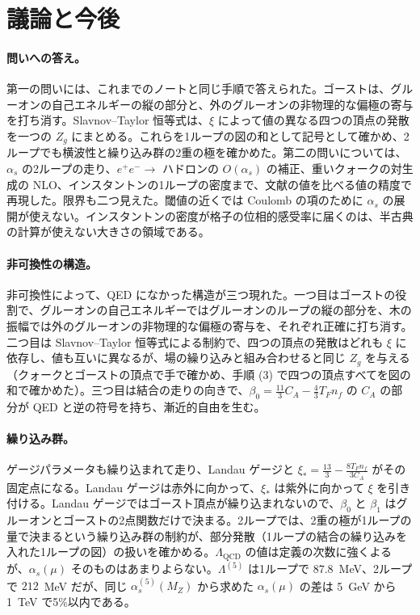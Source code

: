 \documentclass[a4paper,10pt]{ltjsarticle}
\begin{document}
\FloatBarrier
\section{議論と今後}\label{sec:discussion}

\paragraph{問いへの答え。}第一の問いには、これまでのノートと同じ手順で答えられた。ゴーストは、グルーオンの自己エネルギーの縦の部分と、外のグルーオンの非物理的な偏極の寄与を打ち消す。Slavnov--Taylor 恒等式は、$\xi$ によって値の異なる四つの頂点の発散を一つの $Z_g$ にまとめる。これらを1ループの図の和として記号として確かめ、2ループでも横波性と繰り込み群の2重の極を確かめた。第二の問いについては、$\alpha_s$ の2ループの走り、$e^+e^-\to$ ハドロンの $O(\alpha_s)$ の補正、重いクォークの対生成の NLO、インスタントンの1ループの密度まで、文献の値を比べる値の精度で再現した。限界も二つ見えた。閾値の近くでは Coulomb の項のために $\alpha_s$ の展開が使えない。インスタントンの密度が格子の位相的感受率に届くのは、半古典の計算が使えない大きさの領域である。

\paragraph{非可換性の構造。}非可換性によって、QED になかった構造が三つ現れた。一つ目はゴーストの役割で、グルーオンの自己エネルギーではグルーオンのループの縦の部分を、木の振幅では外のグルーオンの非物理的な偏極の寄与を、それぞれ正確に打ち消す。二つ目は Slavnov--Taylor 恒等式による制約で、四つの頂点の発散はどれも $\xi$ に依存し、値も互いに異なるが、場の繰り込みと組み合わせると同じ $Z_g$ を与える（クォークとゴーストの頂点で手で確かめ、手順 (3) で四つの頂点すべてを図の和で確かめた）。三つ目は結合の走りの向きで、$\beta_0=\frac{11}3C_A-\frac43T_Fn_f$ の $C_A$ の部分が QED と逆の符号を持ち、漸近的自由を生む。

\paragraph{繰り込み群。}ゲージパラメータも繰り込まれて走り、Landau ゲージと $\xi_*=\frac{13}3-\frac{8T_Fn_f}{3C_A}$ がその固定点になる。Landau ゲージは赤外に向かって、$\xi_*$ は紫外に向かって $\xi$ を引き付ける。Landau ゲージではゴースト頂点が繰り込まれないので、$\beta_0$ と $\beta_1$ はグルーオンとゴーストの2点関数だけで決まる。2ループでは、2重の極が1ループの量で決まるという繰り込み群の制約が、部分発散（1ループの結合の繰り込みを入れた1ループの図）の扱いを確かめる。$\Lambda_{\mathrm{QCD}}$ の値は定義の次数に強くよるが、$\alpha_s(\mu)$ そのものはあまりよらない。$\Lambda^{(5)}$ は1ループで $87.8$~MeV、2ループで $212$~MeV だが、同じ $\alpha_s^{(5)}(M_Z)$ から求めた $\alpha_s(\mu)$ の差は 5~GeV から 1~TeV で5\%以内である。
\end{document}
